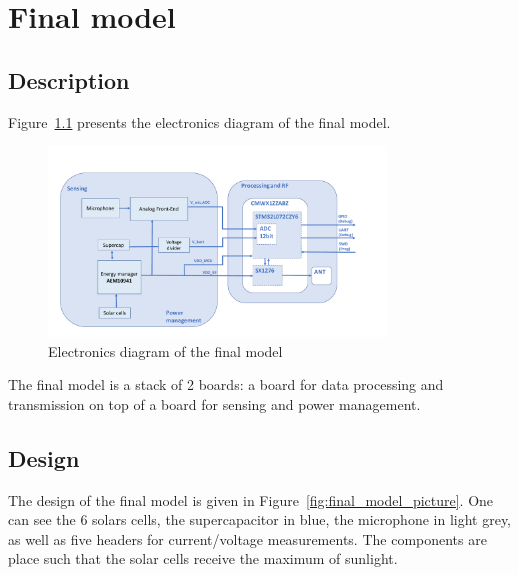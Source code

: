 \documentclass{EPL-master-thesis-covers-EN}
\begin{document}
\chapter{Final model}

\section{Description}

Figure~\ref{fig:electronics_diagram} presents the electronics diagram of the final model.

\begin{figure}[H]
    \centering
    \includegraphics[width=0.8\textwidth]{electronics_diagram.pdf}
    \caption{Electronics diagram of the final model}
    \label{fig:electronics_diagram}
\end{figure}

The final model is a stack of 2 boards: a board for data processing and transmission on top of a board for sensing and power management.

\section{Design}

The design of the final model is given in Figure~\ref{fig:final_model_picture}. One can see the 6 solars cells, the supercapacitor in blue, the microphone in light grey, as well as five headers for current/voltage measurements. The components are place such that the solar cells receive the maximum of sunlight.
\end{document}
